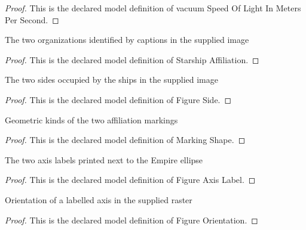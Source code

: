 \begin{proof}
  This is the declared model definition of vacuum Speed Of Light In Meters Per Second.
\end{proof}
\begin{definition}
  \label{def:physics:phyx-mini-0608:phyxminiproblems-problemphyxmini0608-starshipaffiliation}
  The two organizations identified by captions in the supplied image
\end{definition}
\begin{proof}
  This is the declared model definition of Starship Affiliation.
\end{proof}
\begin{definition}
  \label{def:physics:phyx-mini-0608:phyxminiproblems-problemphyxmini0608-figureside}
  The two sides occupied by the ships in the supplied image
\end{definition}
\begin{proof}
  This is the declared model definition of Figure Side.
\end{proof}
\begin{definition}
  \label{def:physics:phyx-mini-0608:phyxminiproblems-problemphyxmini0608-markingshape}
  Geometric kinds of the two affiliation markings
\end{definition}
\begin{proof}
  This is the declared model definition of Marking Shape.
\end{proof}
\begin{definition}
  \label{def:physics:phyx-mini-0608:phyxminiproblems-problemphyxmini0608-figureaxislabel}
  The two axis labels printed next to the Empire ellipse
\end{definition}
\begin{proof}
  This is the declared model definition of Figure Axis Label.
\end{proof}
\begin{definition}
  \label{def:physics:phyx-mini-0608:phyxminiproblems-problemphyxmini0608-figureorientation}
  Orientation of a labelled axis in the supplied raster
\end{definition}
\begin{proof}
  This is the declared model definition of Figure Orientation.
\end{proof}
